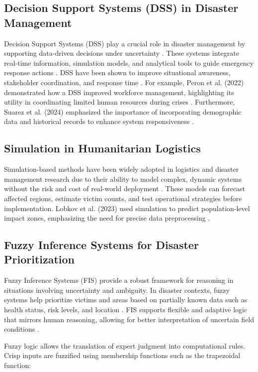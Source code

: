 \documentclass[journal,final,a4paper,twoside,11pt]{IEEEtran}
\begin{document}
\subsection{Decision Support Systems (DSS) in Disaster Management}
Decision Support Systems (DSS) play a crucial role in disaster management by supporting data-driven decisions under uncertainty \cite{khan2023systematic}. These systems integrate real-time information, simulation models, and analytical tools to guide emergency response actions \cite{alghodhaifi2021autonomous}. DSS have been shown to improve situational awareness, stakeholder coordination, and response time \cite{adetiloye2021collaboration}. For example, Peron et al. (2022) demonstrated how a DSS improved workforce management, highlighting its utility in coordinating limited human resources during crises \cite{peron2022decision}. Furthermore, Suarez et al. (2024) emphasized the importance of incorporating demographic data and historical records to enhance system responsiveness \cite{suarez2024integrated}.

\subsection{Simulation in Humanitarian Logistics}
Simulation-based methods have been widely adopted in logistics and disaster management research due to their ability to model complex, dynamic systems without the risk and cost of real-world deployment \cite{chang2022simulation}. These models can forecast affected regions, estimate victim counts, and test operational strategies before implementation. Lobkov et al. (2023) used simulation to predict population-level impact zones, emphasizing the need for precise data preprocessing \cite{lobkov2023determination}.

\subsection{Fuzzy Inference Systems for Disaster Prioritization}
Fuzzy Inference Systems (FIS) provide a robust framework for reasoning in situations involving uncertainty and ambiguity. In disaster contexts, fuzzy systems help prioritize victims and areas based on partially known data such as health status, risk levels, and location \cite{anjomshoae2021integrated}. FIS supports flexible and adaptive logic that mirrors human reasoning, allowing for better interpretation of uncertain field conditions \cite{improta2020fuzzy}.

Fuzzy logic allows the translation of expert judgment into computational rules. Crisp inputs are fuzzified using membership functions such as the trapezoidal function:
\end{document}
